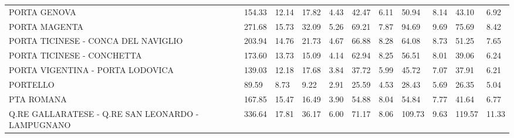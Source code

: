 \begin{table}[H]
{{\begin{tabular}{lp{1.3cm}p{1.3cm}p{1.3cm}p{1.3cm}p{1.3cm}p{1.3cm}p{1.3cm}p{1.3cm}p{1.3cm}p{1.3cm}}
PORTA GENOVA                                       &                    154.33 &                 12.14 &                       17.82 &                    4.43 &                       42.47 &                    6.11 &                       50.94 &                    8.14 &                     43.10 &                  6.92 \\
PORTA MAGENTA                                      &                    271.68 &                 15.73 &                       32.09 &                    5.26 &                       69.21 &                    7.87 &                       94.69 &                    9.69 &                     75.69 &                  8.42 \\
PORTA TICINESE - CONCA DEL NAVIGLIO                &                    203.94 &                 14.76 &                       21.73 &                    4.67 &                       66.88 &                    8.28 &                       64.08 &                    8.73 &                     51.25 &                  7.65 \\
PORTA TICINESE - CONCHETTA                         &                    173.60 &                 13.73 &                       15.09 &                    4.14 &                       62.94 &                    8.25 &                       56.51 &                    8.01 &                     39.06 &                  6.24 \\
PORTA VIGENTINA - PORTA LODOVICA                   &                    139.03 &                 12.18 &                       17.68 &                    3.84 &                       37.72 &                    5.99 &                       45.72 &                    7.07 &                     37.91 &                  6.21 \\
PORTELLO                                           &                     89.59 &                  8.73 &                        9.22 &                    2.91 &                       25.59 &                    4.53 &                       28.43 &                    5.69 &                     26.35 &                  5.04 \\
PTA ROMANA                                         &                    167.85 &                 15.47 &                       16.49 &                    3.90 &                       54.88 &                    8.04 &                       54.84 &                    7.77 &                     41.64 &                  6.77 \\
Q.RE GALLARATESE - Q.RE SAN LEONARDO - LAMPUGNANO  &                    336.64 &                 17.81 &                       36.17 &                    6.00 &                       71.17 &                    8.06 &                      109.73 &                    9.63 &                    119.57 &                 11.33 \\

\end{tabular}}}
\end{table}
